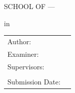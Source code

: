 \begin{titlepage}
  \centering


  \vspace{5mm}
  {\huge\MakeUppercase{School of \getSchool{} --- \getFaculty{}} \par}

  \vspace{5mm}
  {\large\MakeUppercase{\getUniversity{}} \par}

  \vspace{20mm}
  {\Large \getDoctype{} in \getDegree{} \par}

  \vspace{10mm}
  {\huge\bfseries \getTitle{} \par}

  \vspace{10mm}
  {\huge\bfseries \foreignlanguage{ngerman}{\getTitleGer{}} \par}

  \vspace{10mm}
  \begin{tabular}{l l}
    Author:           & \getAuthor{}         \\
    Examiner:         & \getSupervisor{}     \\
    Supervisors:      & \getAdvisor{}        \\
                      & \getSecondAdvisor{}  \\
    Submission Date:  & \getSubmissionDate{} \\
  \end{tabular}

\end{titlepage}
